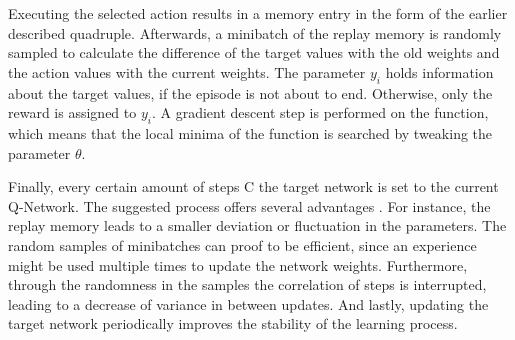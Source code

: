 Executing the selected action results in a memory entry in the form of the earlier described quadruple. Afterwards, a minibatch of the replay memory is randomly sampled to calculate the difference of the target values with the old weights and the action values with the current weights. The parameter $y_i$ holds information about the target values, if the episode is not about to end. Otherwise, only the reward is assigned to $y_i$. A gradient descent step is performed on the function, which means that the local minima of the function is searched by tweaking the parameter $\theta$. 

Finally, every certain amount of steps C the target network is set to the current Q-Network. The suggested process offers several advantages \cite{mnka15}. For instance, the replay memory leads to a smaller deviation or fluctuation in the parameters. The random samples of minibatches can proof to be efficient, since an experience might be used multiple times to update the network weights. Furthermore, through the randomness in the samples the correlation of steps is interrupted, leading to a decrease of variance in between updates. And lastly, updating the target network periodically improves the stability of the learning process.